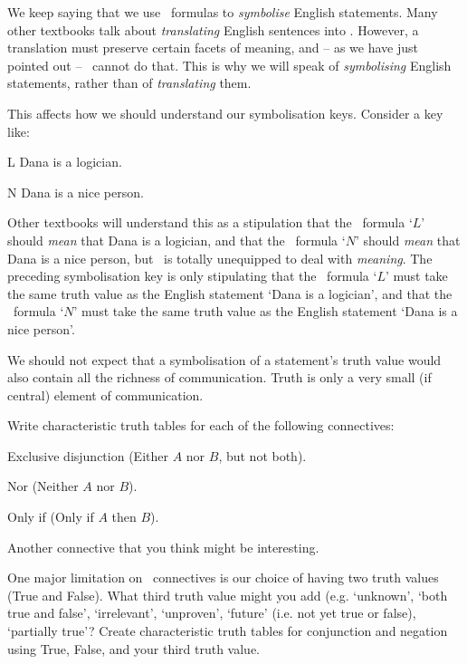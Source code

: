 \documentclass[PHIL101-Textbook.tex]{subfiles}
\begin{document}
We keep saying that we use \tfl\ formulas to \emph{symbolise} English statements. Many other textbooks talk about \emph{translating} English sentences into \tfl. However, a  translation must preserve certain facets of meaning, and -- as we have just pointed out -- \tfl\ cannot do that. This is why we will speak of \emph{symbolising} English statements, rather than of \emph{translating} them.

This affects how we should understand our symbolisation keys. Consider a key like:
	\begin{ekey}
  \item[L] Dana is a logician.
  \item[N] Dana is a nice person.
	\end{ekey}
Other textbooks will understand this as a stipulation that the \tfl\ formula `$L$' should \emph{mean} that Dana is a logician, and that the \tfl\ formula `$N$' should \emph{mean} that Dana is a nice person, but \tfl\ is totally unequipped to deal with \emph{meaning}. The preceding symbolisation key is only stipulating that the \tfl\ formula `$L$' must take the same truth value as the English statement `Dana is a logician', and that the \tfl\ formula `$N$' must take the same truth value as the English statement `Dana is a nice person'. 

We should not expect that a symbolisation of a statement's truth value would also contain all the richness of communication. Truth is only a very small (if central) element of communication.



\pagebreak

\practiceproblems\label{pr.TT.intro}
\problempart
Write characteristic truth tables for each of the following connectives:
\begin{earg}
\item Exclusive disjunction (Either $A$ nor $B$, but not both).
\item Nor (Neither $A$ nor $B$).
\item Only if (Only if $A$ then $B$).
\item Another connective that you think might be interesting.
\end{earg}

\problempart
One major limitation on \tfl\ connectives is our choice of having two truth values (True and False). What third truth value might you add (e.g. `unknown', `both true and false', `irrelevant', `unproven', `future' (i.e. not yet true or false), `partially true'? Create characteristic truth tables for conjunction and negation using True, False, and your third truth value.
\end{document}
